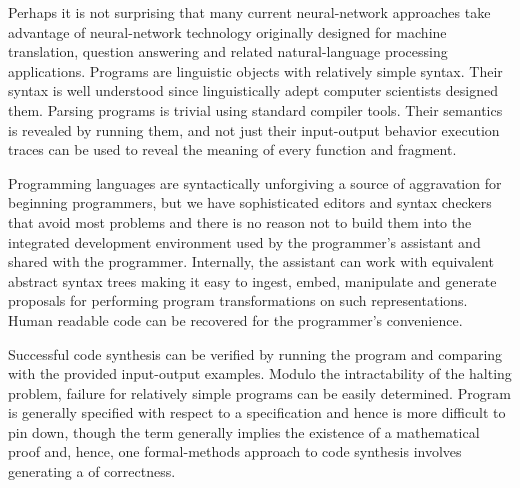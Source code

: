 
Perhaps it is not surprising that many current neural-network approaches take advantage of neural-network technology originally designed for machine translation, question answering and related natural-language processing applications. Programs are linguistic objects with relatively simple syntax. Their syntax is well understood since linguistically adept computer scientists designed them. Parsing programs is trivial using standard compiler tools. Their semantics is revealed by running them, and not just their input-output behavior \emdash{} execution traces can be used to reveal the meaning of every function and fragment. 

Programming languages are syntactically unforgiving \emdash{} a source of aggravation for beginning programmers, but we have sophisticated editors and syntax checkers that avoid most problems and there is no reason not to build them into the integrated development environment used by the programmer's assistant and shared with the programmer. Internally, the assistant can work with equivalent abstract syntax trees making it easy to ingest, embed, manipulate and generate proposals for performing program transformations on such representations. Human readable code can be recovered for the programmer's convenience.

Successful code synthesis can be verified by running the program and comparing with the provided input-output examples. Modulo the intractability of the halting problem, failure for relatively simple programs can be easily determined. Program {} is generally specified with respect to a specification and hence is more difficult to pin down, though the term generally implies the existence of a mathematical proof and, hence, one formal-methods approach to code synthesis involves generating a {} of correctness. 

